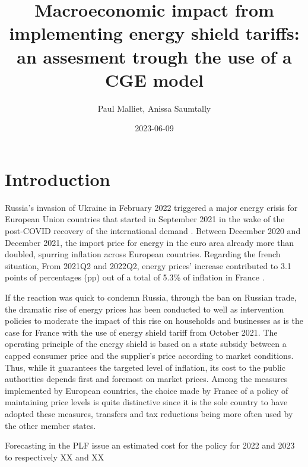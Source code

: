 \documentclass[
  letterpaper,
  DIV=11,
  numbers=noendperiod]{scrartcl}
\title{Macroeconomic impact from implementing energy shield tariffs: an
assesment trough the use of a CGE model}
\author{Paul Malliet, Anissa Saumtally}
\date{2023-06-09}
\renewcommand*\contentsname{Table des matières}
\newcommand\contentsname{Table des matières}
\begin{document}
\maketitle
\ifdefined\Shaded\renewenvironment{Shaded}{\begin{tcolorbox}[boxrule=0pt, interior hidden, breakable, enhanced, borderline west={3pt}{0pt}{shadecolor}, sharp corners, frame hidden]}{\end{tcolorbox}}\fi

\renewcommand*\contentsname{Table des matières}
{
\hypersetup{linkcolor=}
\setcounter{tocdepth}{3}
\tableofcontents
}
\hypertarget{introduction}{%
\section{Introduction}\label{introduction}}

Russia's invasion of Ukraine in February 2022 triggered a major energy
crisis for European Union countries that started in September 2021 in
the wake of the post-COVID recovery of the international demand .
Between December 2020 and December 2021, the import price for energy in
the euro area already more than doubled, spurring inflation across
European countries. Regarding the french situation, From 2021Q2 and
2022Q2, energy prices' increase contributed to 3.1 points of percentages
(pp) out of a total of 5.3\% of inflation in France
\citep{bourgeois_alexandre_flambee_2022}.

If the reaction was quick to condemn Russia, through the ban on Russian
trade, the dramatic rise of energy prices has been conducted to well as
intervention policies to moderate the impact of this rise on households
and businesses \citep{cae2023b} as is the case for France with the use
of energy shield tariff from October 2021. The operating principle of
the energy shield is based on a state subsidy between a capped consumer
price and the supplier's price according to market conditions. Thus,
while it guarantees the targeted level of inflation, its cost to the
public authorities depends first and foremost on market prices. Among
the measures implemented by European countries, the choice made by
France of a policy of maintaining price levels is quite distinctive
\citep{Bruegel} since it is the sole country to have adopted these
measures, transfers and tax reductions being more often used by the
other member states.

Forecasting in the PLF issue an estimated cost for the policy for 2022
and 2023 to respectively XX and XX
\end{document}
